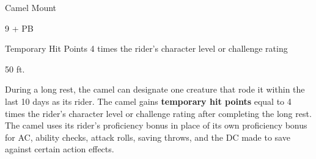 \documentclass[letterpaper,twocolumn,openany,nodeprecatedcode]{dndbook}
\begin{document}
\begin{DndMonster}[float*=b,width=\textwidth + 8pt]{Camel Mount}
  \begin{multicols}{2}

      \DndMonsterLine
      \begin {CustomBasics}
        \item[\armorclassname] 9 + PB
        \item[Temporary Hit Points] 4 times the rider's character level or challenge rating
        \item[\hitpointsname]  
        \item[\speedname] 50 ft.
      \end {CustomBasics}
      \DndMonsterLine

    \DndMonsterAbilityScores[
        str = 16,
        dex = 8,
        con = 14,
        int = 2,
        wis = 8,
        cha = 5,
      ]

    \DndMonsterDetails[
        senses = {passive Perception 9},
        languages = {-},
        challenge = 1/8,
      ]

    During a long rest, the camel can designate one creature that rode it within the last 10 days as its rider. The camel gains \textbf{temporary hit points} equal to 4 times the rider’s character level or challenge rating after completing the long rest. The camel uses its rider’s proficiency bonus in place of its own proficiency bonus for AC, ability checks, attack rolls, saving throws, and the DC made to save against certain action effects.


    \DndMonsterAttack[
      name=Bite,
      distance=melee, %
      mod={+3 + PB},
      dmg=\DndDice{2d4 + 3},
      dmg-type=bludgeoning,
      extra={. If the target is a Medium or smaller creature, the camel tries to grab onto the targets equipment and the target must succeed on a DC 9 + PB Dexterity saving throw or suffer a -2 penalty to AC until it uses have its movement action to fix his armor}
    ]


\end{multicols}
\end{DndMonster}
\end{document}
